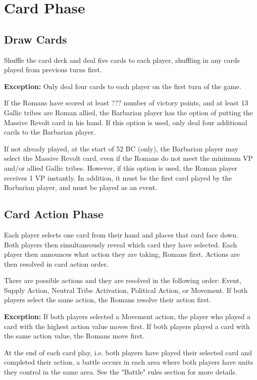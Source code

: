 \section{Card Phase}
\subsection{Draw Cards}
Shuffle the card deck and deal five cards to each player, shuffling in any cards played from previous turns first.

\textbf{Exception:} Only deal four cards to each player on the first turn of the game.

If the Romans have scored at least ??? number of victory points, and at least 13 Gallic tribes are Roman allied, the Barbarian player has the option of putting the Massive Revolt card in his hand. If this option is used, only deal four additional cards to the Barbarian player.

If not already played, at the start of 52 BC (only), the Barbarian player may select the Massive Revolt card, even if the Romans do not meet the minimum VP and/or allied Gallic tribes. However, if this option is used, the Roman player receives 1 VP instantly. In addition, it must be the first card played by the Barbarian player, and must be played as an event.

\subsection{Card Action Phase}
Each player selects one card from their hand and places that card face down. Both players then simultaneously reveal which card they have selected. Each player then announces what action they are taking, Romans first. Actions are then resolved in card action order.

There are possible actions and they are resolved in the following order: Event, Supply Action, Neutral Tribe Activation, Political Action, or Movement. If both players select the same action, the Romans resolve their action first.

\textbf{Exception:} If both players selected a Movement action, the player who played a card with the highest action value moves first. If both players played a card with the same action value, the Romans move first.

At the end of each card play, i.e. both players have played their selected card and completed their action, a battle occurs in each area where both players have units they control in the same area. See the "Battle" rules section for more details.

